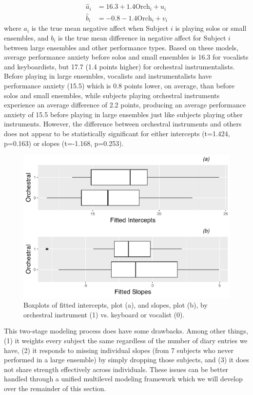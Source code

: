 \documentclass[
]{krantz}
\begin{document}
\begin{align}
\hat{a}_{i} & = 16.3+1.4\textrm{Orch}_{i}+u_{i}
\label{eq:level2s0hat}  \\
\hat{b}_{i} & = -0.8-1.4\textrm{Orch}_{i}+v_{i}
\nonumber
\end{align}
where \(a_{i}\) is the true mean negative affect when Subject \(i\) is playing solos or small ensembles, and \(b_{i}\) is the true mean difference in negative affect for Subject \(i\) between large ensembles and other performance types. Based on these models, average performance anxiety before solos and small ensembles is 16.3 for vocalists and keyboardists, but 17.7 (1.4 points higher) for orchestral instrumentalists. Before playing in large ensembles, vocalists and instrumentalists have performance anxiety (15.5) which is 0.8 points lower, on average, than before solos and small ensembles, while subjects playing orchestral instruments experience an average difference of 2.2 points, producing an average performance anxiety of 15.5 before playing in large ensembles just like subjects playing other instruments. However, the difference between orchestral instruments and others does not appear to be statistically significant for either intercepts (t=1.424, p=0.163) or slopes (t=-1.168, p=0.253).

\begin{figure}

{\centering \includegraphics[width=0.6\linewidth]{bookdown-BeyondMLR_files/figure-latex/mli-boxmat2-1} 

}

\caption{Boxplots of fitted intercepts, plot (a), and slopes, plot (b), by orchestral instrument (1) vs. keyboard or vocalist (0).}\label{fig:mli-boxmat2}
\end{figure}

This two-stage modeling process does have some drawbacks. Among other things, (1) it weights every subject the same regardless of the number of diary entries we have, (2) it responds to missing individual slopes (from 7 subjects who never performed in a large ensemble) by simply dropping those subjects, and (3) it does not share strength effectively across individuals. These issues can be better handled through a unified multilevel modeling framework which we will develop over the remainder of this section.
\end{document}
